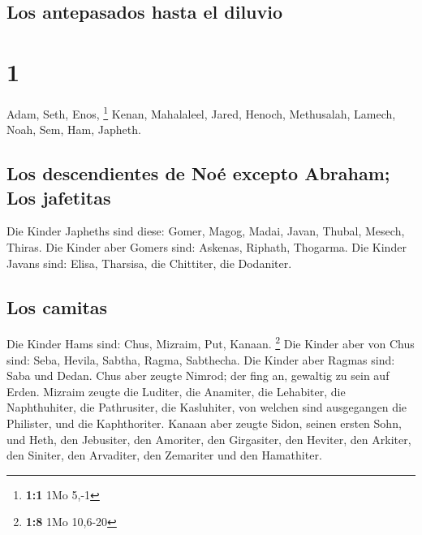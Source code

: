 \hypertarget{los-antepasados-hasta-el-diluvio}{%
\subsection{Los antepasados \hspace{0pt}\hspace{0pt}hasta el
diluvio}\label{los-antepasados-hasta-el-diluvio}}

\hypertarget{section}{%
\section{1}\label{section}}

 Adam, Seth, Enos, \footnote{\textbf{1:1} 1Mo 5,-1}
 Kenan, Mahalaleel, Jared,  Henoch,
Methusalah, Lamech,  Noah, Sem, Ham, Japheth.

\hypertarget{los-descendientes-de-nouxe9-excepto-abraham-los-jafetitas}{%
\subsection{Los descendientes de Noé excepto Abraham; Los
jafetitas}\label{los-descendientes-de-nouxe9-excepto-abraham-los-jafetitas}}

 Die Kinder Japheths sind diese: Gomer, Magog, Madai,
Javan, Thubal, Mesech, Thiras.  Die Kinder aber Gomers
sind: Askenas, Riphath, Thogarma.  Die Kinder Javans sind:
Elisa, Tharsisa, die Chittiter, die Dodaniter.

\hypertarget{los-camitas}{%
\subsection{Los camitas}\label{los-camitas}}

 Die Kinder Hams sind: Chus, Mizraim, Put, Kanaan.
\footnote{\textbf{1:8} 1Mo 10,6-20}  Die Kinder aber von
Chus sind: Seba, Hevila, Sabtha, Ragma, Sabthecha. Die Kinder aber
Ragmas sind: Saba und Dedan.  Chus aber zeugte Nimrod;
der fing an, gewaltig zu sein auf Erden.  Mizraim zeugte
die Luditer, die Anamiter, die Lehabiter, die Naphthuhiter,
 die Pathrusiter, die Kasluhiter, von welchen sind
ausgegangen die Philister, und die Kaphthoriter.  Kanaan
aber zeugte Sidon, seinen ersten Sohn, und Heth,  den
Jebusiter, den Amoriter, den Girgasiter,  den Heviter,
den Arkiter, den Siniter,  den Arvaditer, den Zemariter
und den Hamathiter.

